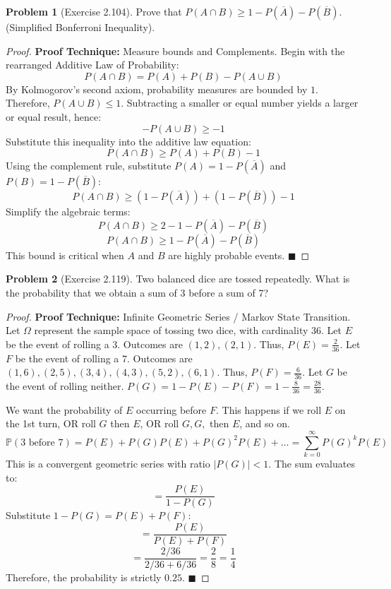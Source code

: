\documentclass[11pt, letterpaper]{article}
\theoremstyle{definition}
\newtheorem{problem}{Problem}
\begin{document}
\vspace{0.5cm}

\begin{problem}[Exercise 2.104]
Prove that $P(A \cap B) \geq 1 - P(\overline{A}) - P(\overline{B})$. (Simplified Bonferroni Inequality).
\end{problem}
\begin{proof}
\textbf{Proof Technique:} Measure bounds and Complements.
Begin with the rearranged Additive Law of Probability:
\[ P(A \cap B) = P(A) + P(B) - P(A \cup B) \]
By Kolmogorov's second axiom, probability measures are bounded by $1$. Therefore, $P(A \cup B) \leq 1$. Subtracting a smaller or equal number yields a larger or equal result, hence:
\[ -P(A \cup B) \geq -1 \]
Substitute this inequality into the additive law equation:
\[ P(A \cap B) \geq P(A) + P(B) - 1 \]
Using the complement rule, substitute $P(A) = 1 - P(\overline{A})$ and $P(B) = 1 - P(\overline{B})$:
\[ P(A \cap B) \geq (1 - P(\overline{A})) + (1 - P(\overline{B})) - 1 \]
Simplify the algebraic terms:
\[ P(A \cap B) \geq 2 - 1 - P(\overline{A}) - P(\overline{B}) \]
\[ P(A \cap B) \geq 1 - P(\overline{A}) - P(\overline{B}) \]
This bound is critical when $A$ and $B$ are highly probable events. $\blacksquare$
\end{proof}

\vspace{0.5cm}

\begin{problem}[Exercise 2.119]
Two balanced dice are tossed repeatedly. What is the probability that we obtain a sum of 3 before a sum of 7?
\end{problem}
\begin{proof}
\textbf{Proof Technique:} Infinite Geometric Series / Markov State Transition.
Let $\Omega$ represent the sample space of tossing two dice, with cardinality $36$.
Let $E$ be the event of rolling a 3. Outcomes are $(1,2), (2,1)$. Thus, $P(E) = \frac{2}{36}$.
Let $F$ be the event of rolling a 7. Outcomes are $(1,6), (2,5), (3,4), (4,3), (5,2), (6,1)$. Thus, $P(F) = \frac{6}{36}$.
Let $G$ be the event of rolling neither. $P(G) = 1 - P(E) - P(F) = 1 - \frac{8}{36} = \frac{28}{36}$.

We want the probability of $E$ occurring before $F$. This happens if we roll $E$ on the 1st turn, OR roll $G$ then $E$, OR roll $G, G,$ then $E$, and so on.
\[ \mathbb{P}(\text{3 before 7}) = P(E) + P(G)P(E) + P(G)^2P(E) + \dots = \sum_{k=0}^\infty P(G)^k P(E) \]
This is a convergent geometric series with ratio $|P(G)| < 1$. The sum evaluates to:
\[ = \frac{P(E)}{1 - P(G)} \]
Substitute $1 - P(G) = P(E) + P(F)$:
\[ = \frac{P(E)}{P(E) + P(F)} \]
\[ = \frac{2/36}{2/36 + 6/36} = \frac{2}{8} = \frac{1}{4} \]
Therefore, the probability is strictly $0.25$. $\blacksquare$
\end{proof}
\end{document}
